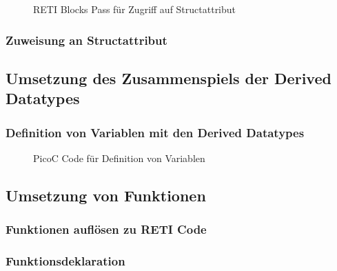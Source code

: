\begin{figure}[H]
  \centering
  \caption{RETI Blocks Pass für Zugriff auf Structattribut}
  \label{fig:reti_blocks_pass_für_zugriff_auf_structattribut}
\end{figure}

\subsubsection{Zuweisung an Structattribut}

\subsection{Umsetzung des Zusammenspiels der Derived Datatypes}
\subsubsection{Definition von Variablen mit den Derived Datatypes}
\begin{figure}[H]
  \centering
  \caption{PicoC Code für Definition von Variablen}
  \label{fig:picoc_code_für_definition_von_variablen}
\end{figure}

{
  \centering
  \label{fig:symboltabelle_für_definition_von_variablen}

}

\subsection{Umsetzung von Funktionen}
\subsubsection{Funktionen auflösen zu RETI Code}
\subsubsection{Funktionsdeklaration}

